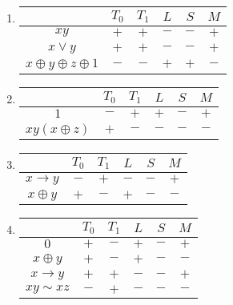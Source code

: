 \begin{solution}
  \begin{enumerate}[1)]
  \item
    \begin{tabular}[b]{|c|c|c|c|c|c|}
      \hline
      & $T_0$ & $T_1$ & $L$ & $S$ & $M$\\
      \hline
      $xy$ & $+$ & $+$ & $-$ & $-$ & $+$\\
      \hline
      $x\vee y$ & $+$ & $+$ & $-$ & $-$ & $+$\\
      \hline
      $x\oplus y\oplus z\oplus 1$ & $-$ & $-$ & $+$ & $+$ & $-$ \\
      \hline
    \end{tabular}
  \item
    \begin{tabular}[b]{|c|c|c|c|c|c|}
      \hline
      & $T_0$ & $T_1$ & $L$ & $S$ & $M$\\
      \hline
      $1$ & $-$ & $+$ & $+$ & $-$ & $+$\\
      \hline
      $xy(x\oplus z)$ & $+$ & $-$ & $-$ & $-$ & $-$\\
      \hline
    \end{tabular}
  \item
    \begin{tabular}[b]{|c|c|c|c|c|c|}
      \hline
      & $T_0$ & $T_1$ & $L$ & $S$ & $M$\\
      \hline
      $x\rightarrow y$ & $-$ & $+$ & $-$ & $-$ & $+$\\
      \hline
      $x\oplus y$ & $+$ & $-$ & $+$ & $-$ & $-$\\
      \hline
    \end{tabular}
  \item
    \begin{tabular}[b]{|c|c|c|c|c|c|}
      \hline
      & $T_0$ & $T_1$ & $L$ & $S$ & $M$\\
      \hline
      $0$ & $+$ & $-$ & $+$ & $-$ & $+$\\
      \hline
      $x\oplus y$ & $+$ & $-$ & $+$ & $-$ & $-$\\
      \hline
      $x\rightarrow y$ & $+$ & $+$ & $-$ & $-$ & $+$\\
      \hline
      $xy \sim xz$ & $-$ & $+$ & $-$ & $-$ & $-$\\
      \hline
    \end{tabular}
  \end{enumerate}
\end{solution}


